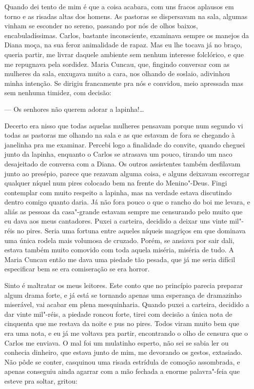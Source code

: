 Quando dei tento de mim é que a coisa acabara, com uns fracos aplausos
em torno e as risadas altas dos homens. As pastoras se dispersavam na
sala, algumas vinham se esconder no sereno, passando por nós de olhos
baixos, encabuladíssimas. Carlos, bastante inconsciente, examinava
sempre os manejos da Diana moça, na sua feroz animalidade de rapaz. Mas
eu lhe tocava já no braço, queria partir, me livrar daquele ambiente sem
nenhum interesse folclórico, e que me repugnava pela sordidez. Maria
Cuncau, que, fingindo conversar com as mulheres da sala, enxugava muito
a cara, nos olhando de soslaio, adivinhou minha intenção. Se dirigiu
francamente pra nós e convidou, meio apressada mas sem nenhuma timidez,
com decisão:

--- Os senhores não querem adorar a lapinha!\ldots{}

Decerto era nisso que todas aquelas mulheres pensavam porque num segundo
vi todas as pastoras me olhando na sala e as que estavam de fora se
chegando à janelinha pra me examinar. Percebi logo a finalidade do
convite, quando cheguei junto da lapinha, enquanto o Carlos se atrasava
um pouco, tirando um naco desajeitado de conversa com a Diana. Os outros
assistentes também desfilavam junto ao presépio, parece que rezavam
alguma coisa, e alguns deixavam escorregar qualquer níquel num pires
colocado bem na frente do Menino"-Deus. Fingi contemplar com muito
respeito a lapinha, mas na verdade estava discutindo dentro comigo
quanto daria. Já não fora pouco o que o rancho do boi me levara, e aliás
as pessoas da casa"-grande estavam sempre me censurando pelo muito que eu
dava aos meus cantadores. Puxei a carteira, decidido a deixar uns vinte
mil"-réis no pires. Seria uma fortuna entre aqueles níqueis magriços em
que dominava uma única rodela mais volumosa de cruzado. Porém, se
ansiava por sair dali, estava também muito comovido com toda aquela
miséria, miséria de tudo. A Maria Cuncau então me dava uma piedade tão
pesada, que já me seria difícil especificar bem se era comiseração se
era horror.

Sinto é maltratar os meus leitores. Este conto que no princípio parecia
preparar algum drama forte, e já está se tornando apenas uma esperança
de dramazinho miserável, vai acabar em plena mesquinharia. Quando puxei
a carteira, decidido a dar vinte mil"-réis, a piedade roncou forte, tirei
com decisão a única nota de cinquenta que me restava da noite e pus no
pires. Todos viram muito bem que era uma nota, e eu já me voltava pra
partir, encontrando o olho de censura que o Carlos me enviava. O mal foi
um mulatinho esperto, não sei se sabia ler ou conhecia dinheiro, que
estava junto de mim, me devorando os gestos, extasiado. Não pôde se
conter, casquinou uma risada estrídula de comoção assombrada, e apenas
conseguiu ainda agarrar com a mão fechada a enorme palavra"-feia que
esteve pra soltar, gritou:

